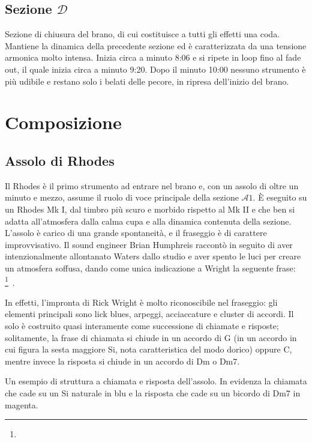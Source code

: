 \documentclass[class=book, crop=false, oneside, 12pt]{standalone}
\begin{document}
    
    \subsection*{Sezione \(\mathcal{D}\)}
    Sezione di chiusura del brano, di cui costituisce a tutti gli effetti una coda. Mantiene la dinamica della precedente sezione ed è caratterizzata da una tensione armonica molto intensa. Inizia circa a minuto 8:06 e si ripete in loop fino al fade out, il quale inizia circa a minuto 9:20. Dopo il minuto 10:00 nessuno strumento è più udibile e restano solo i belati delle pecore, in ripresa dell'inizio del brano.
    
    \section{Composizione}
    \label{sec:03-arrangement}

    \subsection{Assolo di Rhodes}
    Il Rhodes è il primo strumento ad entrare nel brano e, con un assolo di oltre un minuto e mezzo, assume il ruolo di voce principale della sezione \(\mathcal{A}1\). È eseguito su un Rhodes Mk I, dal timbro più scuro e morbido rispetto al Mk II e che ben si adatta all'atmosfera dalla calma cupa e alla dinamica contenuta della sezione. L'assolo è carico di una grande spontaneità, e il fraseggio è di carattere improvvisativo. Il sound engineer Brian Humphreis raccontò in seguito di aver intenzionalmente allontanato Waters dallo studio e aver spento le luci per creare un atmosfera soffusa, dando come unica indicazione a Wright la seguente frase: \footnote{}~\cite{easlea2022raving}.

    
    In effetti, l'impronta di Rick Wright è molto riconoscibile nel fraseggio: gli elementi principali sono lick blues, arpeggi, acciaccature e cluster di accordi. Il solo è costruito quasi interamente come successione di chiamate e risposte; solitamente, la frase di chiamata si chiude in un accordo di G (in un accordo in cui figura la sesta maggiore Si, nota caratteristica del modo dorico) oppure C, mentre invece la risposta si chiude in un accordo di Dm o Dm7.

    \begin{sheet}[htbp]
        \centering
        \caption[Un esempio di struttura a chiamata e risposta dell'assolo.]{Un esempio di struttura a chiamata e risposta dell'assolo. In evidenza la chiamata che cade su un Si naturale in blu e la risposta che cade su un bicordo di Dm7 in magenta.}
        \label{sheet:sheep-epiano_solo}
    \end{sheet}
\end{document}
